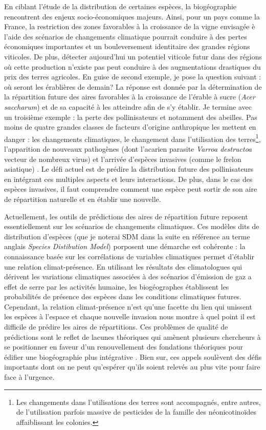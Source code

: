 En ciblant l'étude de la distribution de certaines espèces, la
biogéographie rencontrent des enjeux socio-économiques majeurs. Ainsi,
pour un pays comme la France, la restriction des zones favorables à la
croissance de la vigne envisagée è l'aide des scénarios de changements
climatique \citep{Hannah2013} pourrait conduire à des pertes économiques
importantes et un bouleversement identitaire des grandes régions
viticoles. De plus, détecter aujourd'hui un potentiel viticole futur
dans des régions où cette production n'existe pas peut conduire à des
augmentations drastiques du prix des terres agricoles. En guise de
second exemple, je pose la question suivant : où seront les érablières
de demain? La réponse est donnée par la détermination de la répartition
future des aires favorables à la croissance de l'érable à sucre
(\emph{Acer saccharum}) et de sa capacité à les atteindre afin de s'y
établir. Je termine avec un troisième exemple : la perte des
pollinisateurs et notamment des abeilles. Pas moins de quatre grandes
classes de facteurs d'origine anthropique les mettent en danger : les
changements climatiques, le changement dans l'utilisation des
terres\footnote{Les changements dans l'utilisations des terres sont
  accompagnés, entre autres, de l'utilisation parfois massive de
  pesticides de la famille des néonicotinoïdes affaiblissant les
  colonies.}, l'apparition de nouveaux pathogènes (dont l'acarien
parasite \emph{Varroa destructoa} vecteur de nombreux virus) et
l'arrivée d'espèces invasives (comme le frelon asiatique)
\citep{Vanbergen2013}. Le défi actuel est de prédire la distribution
future des pollinisateurs en intégrant ces multiples aspects et leurs
interactions. De plus, dans le cas des espèces invasives, il faut
comprendre comment une espèce peut sortir de son aire de répartition
naturelle et en établir une nouvelle.

Actuellement, les outils de prédictions des aires de répartition future
reposent essentiellement sur les scénarios de changements climatiques.
Ces modèles dits de distribution d'espèces (que je noterai SDM dans la
suite en référence au terme anglais \emph{Species Distibution Model})
porposent une démarche est cohérente : la connaissance basée sur les
corrélations de variables climatiques permet d'établir une relation
climat-présence. En utilisant les résultats des climatologues qui
dérivent les variations climatiques associées à des scénarios d'émission
de gaz a effet de serre par les activités humaine, les biogéographes
établissent les probabilités de présence des espèces dans les conditions
climatiques futures. Cependant, la relation climat-présence n'est qu'une
facette du lien qui unissent les espèces à l'espace et chaque nouvelle
invasion nous montre à quel point il est difficile de prédire les aires
de répartitions. Ces problèmes de qualité de prédictions sont le reflet
de lacunes théoriques qui amènent plusieurs chercheurs à se positionner
en faveur d'un renouvellement des fondations théoriques pour édifier une
biogéographie plus intégrative
\citep{Lomolino2000, Beck2012, Thuiller2013}. Bien sur, ces appels
soulèvent des défis importants dont on ne peut qu'espérer qu'ils soient
relevés au plus vite pour faire face à l'urgence.

